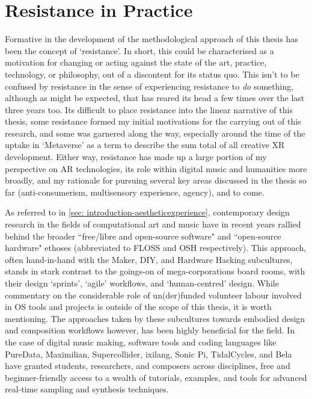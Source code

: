 \section{Resistance in Practice} \label{sec: method-resistance}
Formative in the development of the methodological approach of this thesis has been the concept of `resistance'. In short, this could be characterised as a motivation for changing or acting against the state of the art, practice, technology, or philosophy, out of a discontent for its status quo. This isn't to be confused by resistance in the sense of experiencing resistance to \textit{do} something, although as might be expected, that has reared its head a few times over the last three years too. Its difficult to place resistance into the linear narrative of this thesis, some resistance formed my initial motivations for the carrying out of this research, and some was garnered along the way, especially around the time of the uptake in `Metaverse' as a term to describe the sum total of all creative XR development. Either way, resistance has made up a large portion of my perspective on AR technologies, its role within digital music and humanities more broadly, and my rationale for pursuing several key areas discussed in the thesis so far (anti-consumerism, multisensory experience, agency), and to come.

As referred to in \autoref{sec: introduction-aestheticexperience}, contemporary design research in the fields of computational art and music have in recent years rallied behind the broader ``free/libre and open-source software" and ``open-source hardware" ethoses (abbreviated to FLOSS and OSH respectively). This approach, often hand-in-hand with the Maker, DIY, and Hardware Hacking subcultures, stands in stark contrast to the goings-on of mega-corporations board rooms, with their design `sprints', `agile' workflows, and `human-centred' design. While commentary on the considerable role of un(der)funded volunteer labour involved in OS tools and projects is outside of the scope of this thesis, it is worth mentioning. The approaches taken by these subcultures towards embodied design and composition workflows however, has been highly beneficial for the field. In the case of digital music making, software tools and coding languages like PureData, Maximilian, Supercollider, ixilang, Sonic Pi, TidalCycles, and Bela have granted students, researchers, and composers across disciplines, free and beginner-friendly access to a wealth of tutorials, examples, and tools for advanced real-time sampling and synthesis techniques.

